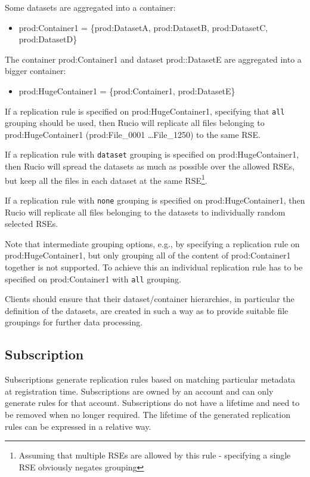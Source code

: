 \documentclass{atlasnote}
\newcommand{\code}[1]{\texttt{#1}}
\begin{document}
Some datasets are aggregated into a container:
\begin{itemize}
	\item[] prod:Container1 = \{prod:DatasetA, prod:DatasetB, prod:DatasetC, prod:DatasetD\}
\end{itemize}

The container prod:Container1 and dataset prod::DatasetE are aggregated into a bigger container:
\begin{itemize}
	\item[] prod:HugeContainer1 = \{prod:Container1, prod:DatasetE\}
\end{itemize}

If a replication rule is specified on prod:HugeContainer1, specifying that \code{all} grouping should be used, then Rucio will replicate
all files belonging to prod:HugeContainer1 (prod:File\_0001 \ldots File\_1250) to the same RSE.

If a replication rule with \code{dataset} grouping is specified on prod:HugeContainer1, then Rucio will spread the datasets as much as
possible over the allowed RSEs, but keep all the files in each dataset at the same RSE\footnote{Assuming that multiple RSEs are allowed by this rule - specifying a single RSE obviously negates grouping}.

If a replication rule with \code{none} grouping is specified on prod:HugeContainer1, then Rucio will
replicate all files belonging to the datasets to individually random selected RSEs.

Note that intermediate grouping options, e.g., by specifying a replication rule on prod:HugeContainer1, but only grouping all
of the content of prod:Container1 together is not supported. To achieve this an individual replication rule has to be specified on prod:Container1 with \code{all} grouping.

Clients should ensure that their dataset/container hierarchies, in particular the definition of the datasets, are created in
such a way as to provide suitable file groupings for further data processing.

\subsection{Subscription}
\label{sec:Subscription}

Subscriptions generate replication rules based on matching particular metadata at registration time. Subscriptions are owned by an account and can only generate rules for that account. Subscriptions do not have a lifetime and need to be removed when no longer required. The lifetime of the generated replication rules can be expressed in a relative way.
\end{document}
